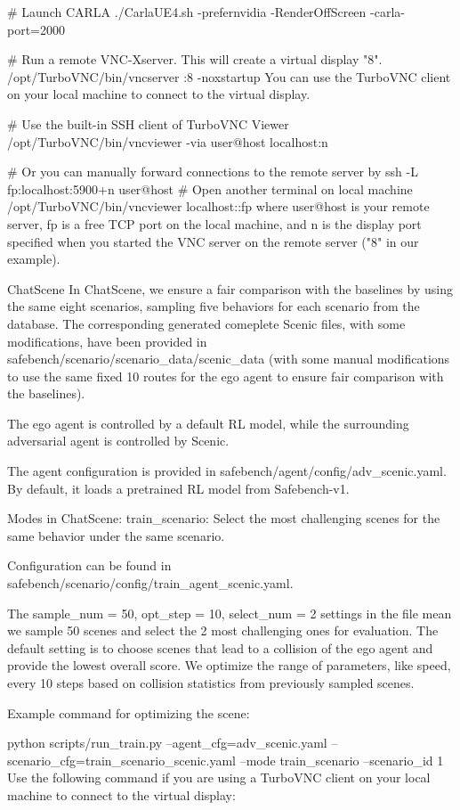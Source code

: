 \begin{appendix}
\# Launch CARLA
./CarlaUE4.sh -prefernvidia -RenderOffScreen -carla-port=2000

\# Run a remote VNC-Xserver. This will create a virtual display "8".
/opt/TurboVNC/bin/vncserver :8 -noxstartup
You can use the TurboVNC client on your local machine to connect to the virtual display.

\# Use the built-in SSH client of TurboVNC Viewer
/opt/TurboVNC/bin/vncviewer -via user@host localhost:n

\# Or you can manually forward connections to the remote server by
ssh -L fp:localhost:5900+n user@host
\# Open another terminal on local machine
/opt/TurboVNC/bin/vncviewer localhost::fp
where user@host is your remote server, fp is a free TCP port on the local machine, and n is the display port specified when you started the VNC server on the remote server ("8" in our example).

ChatScene
In ChatScene, we ensure a fair comparison with the baselines by using the same eight scenarios, sampling five behaviors for each scenario from the database. The corresponding generated comeplete Scenic files, with some modifications, have been provided in safebench/scenario/scenario\_data/scenic\_data (with some manual modifications to use the same fixed 10 routes for the ego agent to ensure fair comparison with the baselines).

The ego agent is controlled by a default RL model, while the surrounding adversarial agent is controlled by Scenic.

The agent configuration is provided in safebench/agent/config/adv\_scenic.yaml. By default, it loads a pretrained RL model from Safebench-v1.

Modes in ChatScene:
train\_scenario: Select the most challenging scenes for the same behavior under the same scenario.

Configuration can be found in safebench/scenario/config/train\_agent\_scenic.yaml.

The sample\_num = 50, opt\_step = 10, select\_num = 2 settings in the file mean we sample 50 scenes and select the 2 most challenging ones for evaluation. The default setting is to choose scenes that lead to a collision of the ego agent and provide the lowest overall score. We optimize the range of parameters, like speed, every 10 steps based on collision statistics from previously sampled scenes.

Example command for optimizing the scene:

python scripts/run\_train.py --agent\_cfg=adv\_scenic.yaml --scenario\_cfg=train\_scenario\_scenic.yaml --mode train\_scenario --scenario\_id 1
Use the following command if you are using a TurboVNC client on your local machine to connect to the virtual display:


\end{appendix}
